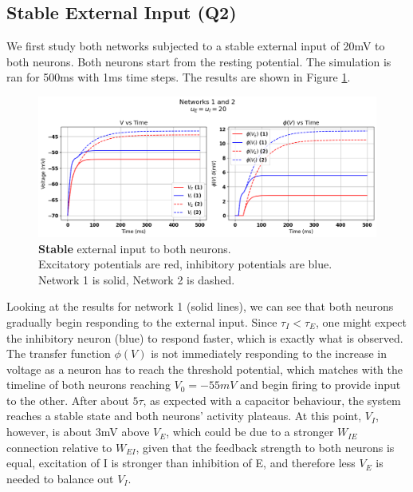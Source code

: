 \documentclass[10pt,twocolumn]{article}
\begin{document}
\subsection{Stable External Input (Q2)}
We first study both networks subjected to a stable external input of 20mV to
both neurons.
Both neurons start from the resting potential. The simulation is ran for 500ms
with 1ms time steps. The results are shown in Figure \ref{fig:stable-input}.

\begin{figure}
    \centering
    \captionsetup{justification=centering}
    \includegraphics[width=1\textwidth]{images/12-stable.png}
    \caption{
        \textbf{Stable} external input to both neurons.\\
        Excitatory potentials are red, inhibitory potentials are blue. \\
        Network 1 is solid, Network 2 is dashed.
    }
    \label{fig:stable-input}
\end{figure}

Looking at the results for network 1 (solid lines), we can see that both neurons
gradually begin responding to the external input. Since $\tau_I < \tau_E$,
one might expect the inhibitory neuron (blue) to respond faster, which is
exactly what is observed. The transfer function $\phi(V)$ is not immediately
responding to the increase in voltage as a neuron has to reach the threshold
potential, which matches with the timeline of both neurons reaching $V_0=-55mV$
and begin firing to provide input to the other. After about $5\tau$, as
expected with a capacitor behaviour, the system reaches a stable state
and both neurons' activity plateaus. At this point, $V_I$, however,
is about 3mV above $V_E$, which could be due to a stronger $W_{IE}$ connection
relative to $W_{EI}$, given that the feedback strength to both neurons is equal,
excitation of I is stronger than inhibition of E, and therefore less $V_E$
is needed to balance out $V_I$.
\end{document}
